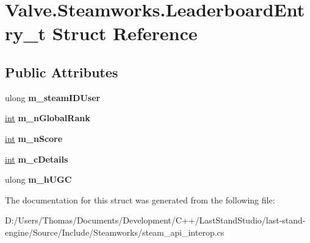 \hypertarget{structValve_1_1Steamworks_1_1LeaderboardEntry__t}{}\section{Valve.\+Steamworks.\+Leaderboard\+Entry\+\_\+t Struct Reference}
\label{structValve_1_1Steamworks_1_1LeaderboardEntry__t}
\subsection*{Public Attributes}
\begin{DoxyCompactItemize}
\item 
\hypertarget{structValve_1_1Steamworks_1_1LeaderboardEntry__t_a521bb9e594ff1fe1141b824491a4f9cb}{}ulong {\bfseries m\+\_\+steam\+I\+D\+User}\label{structValve_1_1Steamworks_1_1LeaderboardEntry__t_a521bb9e594ff1fe1141b824491a4f9cb}

\item 
\hypertarget{structValve_1_1Steamworks_1_1LeaderboardEntry__t_ad04b93afef6f0ae37bd0157545af89a0}{}\hyperlink{SDL__thread_8h_a6a64f9be4433e4de6e2f2f548cf3c08e}{int} {\bfseries m\+\_\+n\+Global\+Rank}\label{structValve_1_1Steamworks_1_1LeaderboardEntry__t_ad04b93afef6f0ae37bd0157545af89a0}

\item 
\hypertarget{structValve_1_1Steamworks_1_1LeaderboardEntry__t_ac03cf725a162adf80d652e185340232f}{}\hyperlink{SDL__thread_8h_a6a64f9be4433e4de6e2f2f548cf3c08e}{int} {\bfseries m\+\_\+n\+Score}\label{structValve_1_1Steamworks_1_1LeaderboardEntry__t_ac03cf725a162adf80d652e185340232f}

\item 
\hypertarget{structValve_1_1Steamworks_1_1LeaderboardEntry__t_a3571ff22e52c901b3ffbb34a105fd2d4}{}\hyperlink{SDL__thread_8h_a6a64f9be4433e4de6e2f2f548cf3c08e}{int} {\bfseries m\+\_\+c\+Details}\label{structValve_1_1Steamworks_1_1LeaderboardEntry__t_a3571ff22e52c901b3ffbb34a105fd2d4}

\item 
\hypertarget{structValve_1_1Steamworks_1_1LeaderboardEntry__t_a9fea26d7914276cc870626ae8fe3d313}{}ulong {\bfseries m\+\_\+h\+U\+G\+C}\label{structValve_1_1Steamworks_1_1LeaderboardEntry__t_a9fea26d7914276cc870626ae8fe3d313}

\end{DoxyCompactItemize}


The documentation for this struct was generated from the following file\+:\begin{DoxyCompactItemize}
\item 
D\+:/\+Users/\+Thomas/\+Documents/\+Development/\+C++/\+Last\+Stand\+Studio/last-\/stand-\/engine/\+Source/\+Include/\+Steamworks/steam\+\_\+api\+\_\+interop.\+cs\end{DoxyCompactItemize}
